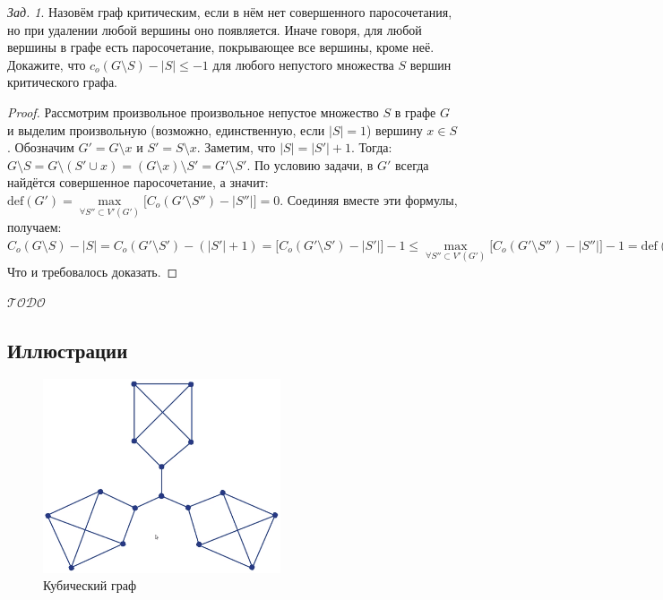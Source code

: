 \documentclass[a4paper,12pt]{article}
\theoremstyle{remark}
\newtheorem{problem}{Зад.}[section]
\def\iiTODO{\guillemotleft$\mathcal{TODO}$\guillemotright\textellipsis}
\begin{document}
\begin{problem}
  Назовём граф критическим, если в нём нет совершенного паросочетания, но при удалении любой вершины оно появляется. Иначе говоря, для любой вершины в графе есть паросочетание,	покрывающее все вершины, кроме неё. Докажите, что $c_o(G \setminus S) - |S| \leqslant -1$ для любого непустого множества $S$ вершин критического графа.
\end{problem}
\begin{proof}
  Рассмотрим произвольное произвольное непустое множество $S$ в графе $G$
  и выделим произвольную (возможно, единственную, если $|S|=1$) вершину $x \in S$.
  Обозначим $G' = G \setminus x$ и $S' = S \setminus x$.
  Заметим, что $ |S| = |S'| + 1 $.
  Тогда:
  $ G \setminus S = G \setminus (S' \cup x) = (G \setminus x) \setminus S' = G' \setminus S' $.
  По условию задачи, в $G'$ всегда найдётся совершенное паросочетание, а значит:
  $ \mathrm{def}(G') = \max \limits_{\forall S'' \subset V'(G')} \big[ C_o(G' \setminus S'') - |S''| \big] = 0 $.
  Соединяя вместе эти формулы, получаем:
  $C_o(G \setminus S) - |S| = C_o(G' \setminus S') - (|S'| + 1) = \big[ C_o(G' \setminus S') - |S'| \big] - 1 \leqslant
   \max \limits_{\forall S'' \subset V'(G')} \big[ C_o(G' \setminus S'') - |S''| \big] - 1
   = \mathrm{def}(G') - 1 = 0 - 1 = -1 $
  Что и требовалось доказать. 
\end{proof}

\iiTODO


\subsection{Иллюстрации}

\begin{figure}[H]
	\centering
	\includegraphics[width=7cm]{cubic-graph-example1.png}
	\caption{Кубический граф}
\end{figure}
\end{document}
